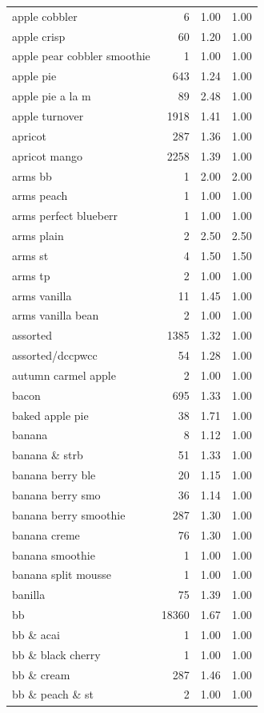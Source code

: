 \begin{table}
\begin{tabular}{lrrr}
apple cobbler & 6 & 1.00 & 1.00 \\
apple crisp & 60 & 1.20 & 1.00 \\
apple pear cobbler smoothie & 1 & 1.00 & 1.00 \\
apple pie & 643 & 1.24 & 1.00 \\
apple pie a la m & 89 & 2.48 & 1.00 \\
apple turnover & 1918 & 1.41 & 1.00 \\
apricot & 287 & 1.36 & 1.00 \\
apricot mango & 2258 & 1.39 & 1.00 \\
arms bb & 1 & 2.00 & 2.00 \\
arms peach & 1 & 1.00 & 1.00 \\
arms perfect blueberr & 1 & 1.00 & 1.00 \\
arms plain & 2 & 2.50 & 2.50 \\
arms st & 4 & 1.50 & 1.50 \\
arms tp & 2 & 1.00 & 1.00 \\
arms vanilla & 11 & 1.45 & 1.00 \\
arms vanilla bean & 2 & 1.00 & 1.00 \\
assorted & 1385 & 1.32 & 1.00 \\
assorted/dccpwcc & 54 & 1.28 & 1.00 \\
autumn carmel apple & 2 & 1.00 & 1.00 \\
bacon & 695 & 1.33 & 1.00 \\
baked apple pie & 38 & 1.71 & 1.00 \\
banana & 8 & 1.12 & 1.00 \\
banana \& strb & 51 & 1.33 & 1.00 \\
banana berry ble & 20 & 1.15 & 1.00 \\
banana berry smo & 36 & 1.14 & 1.00 \\
banana berry smoothie & 287 & 1.30 & 1.00 \\
banana creme & 76 & 1.30 & 1.00 \\
banana smoothie & 1 & 1.00 & 1.00 \\
banana split mousse & 1 & 1.00 & 1.00 \\
banilla & 75 & 1.39 & 1.00 \\
bb & 18360 & 1.67 & 1.00 \\
bb \& acai & 1 & 1.00 & 1.00 \\
bb \& black cherry & 1 & 1.00 & 1.00 \\
bb \& cream & 287 & 1.46 & 1.00 \\
bb \& peach \& st & 2 & 1.00 & 1.00 \\

\end{tabular}
\end{table}

